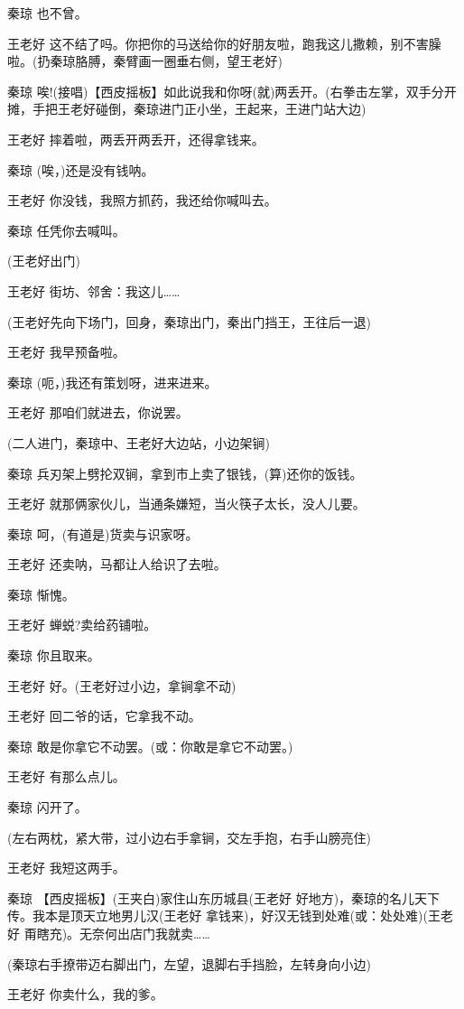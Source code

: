 秦琼 也不曾。

王老好
这不结了吗。你把你的马送给你的好朋友啦，跑我这儿撒赖，别不害臊啦。(扔秦琼胳膊，秦臂画一圈垂右侧，望王老好)

秦琼
唉!(接唱)【西皮摇板】如此说我和你呀(就)两丢开。(右拳击左掌，双手分开摊，手把王老好碰倒，秦琼进门正小坐，王起来，王进门站大边)

王老好 摔着啦，两丢开两丢开，还得拿钱来。

秦琼 (唉，)还是没有钱呐。

王老好 你没钱，我照方抓药，我还给你喊叫去。

秦琼 任凭你去喊叫。

(王老好出门)

王老好 街坊、邻舍：我这儿\ldots{}\ldots{}

(王老好先向下场门，回身，秦琼出门，秦出门挡王，王往后一退)

王老好 我早预备啦。

秦琼 (呃，)我还有策划呀，进来进来。

王老好 那咱们就进去，你说罢。

(二人进门，秦琼中、王老好大边站，小边架锏)

秦琼 兵刃架上劈抡双锏，拿到市上卖了银钱，(算)还你的饭钱。

王老好 就那俩家伙儿，当通条嫌短，当火筷子太长，没人儿要。

秦琼 呵，(有道是)货卖与识家呀。

王老好 还卖呐，马都让人给识了去啦。

秦琼 惭愧。

王老好 蝉蜕?卖给药铺啦。

秦琼 你且取来。

王老好 好。(王老好过小边，拿锏拿不动)

王老好 回二爷的话，它拿我不动。

秦琼 敢是你拿它不动罢。(或：你敢是拿它不动罢。)

王老好 有那么点儿。

秦琼 闪开了。

(左右两枕，紧大带，过小边右手拿锏，交左手抱，右手山膀亮住)

王老好 我短这两手。

秦琼 【西皮摇板】(王夹白)家住山东历城县(王老好
好地方)，秦琼的名儿天下传。我本是顶天立地男儿汉(王老好
拿钱来)，好汉无钱到处难(或：处处难)(王老好
甭瞎充)。无奈何出店门我就卖\ldots{}\ldots{}

(秦琼右手撩带迈右脚出门，左望，退脚右手挡脸，左转身向小边)

王老好 你卖什么，我的爹。

